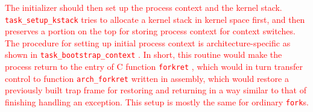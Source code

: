 \documentclass{report}
\begin{document}
	\textcolor{red}{
		The initializer should then set up the process context and the kernel stack.
		\texttt{task\_setup\_kstack}
		 tries to allocate a kernel stack in kernel space first, and then preserves
		a portion on the top for storing process context for context switches.
		The procedure for setting up initial process context is architecture-specific as
		shown in \texttt{task\_bootstrap\_context}
		.  In short, this routine would make the process return to the entry of C
		function \texttt{forkret}
		, which would in turn transfer control to function \texttt{arch\_forkret}
		 written in assembly, which would restore a previously built trap frame
		for restoring and returning in a way similar to that of finishing handling
		an exception.  This setup is mostly the same for ordinary \texttt{fork}s.
	}
	
\end{document}
